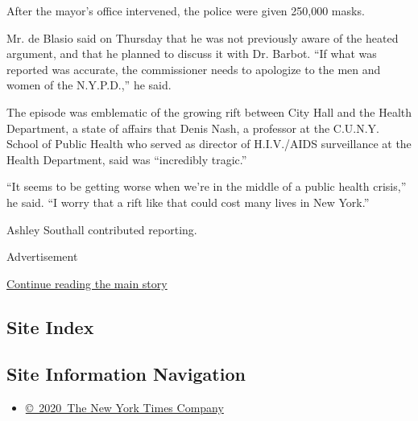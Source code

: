 After the mayor's office intervened, the police were given 250,000
masks.

Mr. de Blasio said on Thursday that he was not previously aware of the
heated argument, and that he planned to discuss it with Dr. Barbot. ``If
what was reported was accurate, the commissioner needs to apologize to
the men and women of the N.Y.P.D.,'' he said.

The episode was emblematic of the growing rift between City Hall and the
Health Department, a state of affairs that Denis Nash, a professor at
the C.U.N.Y. School of Public Health who served as director of
H.I.V./AIDS surveillance at the Health Department, said was ``incredibly
tragic.''

``It seems to be getting worse when we're in the middle of a public
health crisis,'' he said. ``I worry that a rift like that could cost
many lives in New York.''

Ashley Southall contributed reporting.

Advertisement

\protect\hyperlink{after-bottom}{Continue reading the main story}

\hypertarget{site-index}{%
\subsection{Site Index}\label{site-index}}

\hypertarget{site-information-navigation}{%
\subsection{Site Information
Navigation}\label{site-information-navigation}}

\begin{itemize}
\tightlist
\item
  \href{https://help.nytimes3xbfgragh.onion/hc/en-us/articles/115014792127-Copyright-notice}{©~2020~The
  New York Times Company}
\end{itemize}

